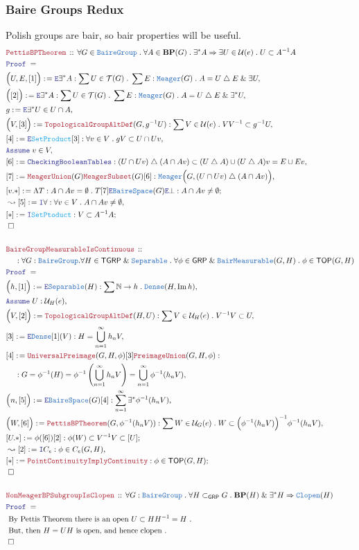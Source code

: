 \documentclass[12pt]{scrartcl}
\newcommand{\TYPE}[1]{\textcolor{NavyBlue}{\mathtt{#1}}}
\newcommand{\FUNC}[1]{\textcolor{Cerulean}{\mathtt{#1}}}
\newcommand{\LOGIC}[1]{\textcolor{Blue}{\mathtt{#1}}}
\newcommand{\THM}[1]{\textcolor{Maroon}{\mathtt{#1}}}
\renewcommand{\.}{\; . \;}
\newcommand{\de}{: \kern 0.1pc =}
\newcommand{\Theorem}[2]{& \THM{#1} \, :: \, #2 \\ & \Proof = \\ }
\newcommand{\NewLine}{\\ & \kern 1pc}
\newcommand{\Page}[1]{ \begin{align*} #1 \end{align*}   }
\renewcommand{\And}{\; \& \;}
\newcommand{\Imply}{\Rightarrow}
\newcommand{\Nat}{\mathbb{N} }
\DeclareMathOperator*{\im}{Im}
\newcommand{\du}{\; \triangle \;}
\newcommand{\Say}[3]{& #1 \de #2 : #3, \\}
\newcommand{\SayIn}[3]{& #1 \de #2 \in #3, \\}
\newcommand{\Conclude}[3]{& #1 \de #2 : #3; \\}
\newcommand{\Derive}[3]{& \leadsto #1 \de #2 : #3, \\}
\newcommand{\Assume}[2]{& \LOGIC{Assume} \; #1 : #2, \\}
\newcommand{\AssumeIn}[2]{& \LOGIC{Assume} \; #1 \in #2, \\}
\newcommand{\Explain}[1]{& \text{#1.} \\}
\newcommand{\Intro}{\LOGIC{I}}
\newcommand{\Elim}{\LOGIC{E}}
\newcommand{\QED}{\; \square}
\newcommand{\EndProof}{& \QED \\}
\newcommand{\Proof}{\LOGIC{Proof} \; }
\newcommand{\Dense}{\TYPE{Dense}}
\newcommand{\Separable}{\TYPE{Separable}}
\newcommand{\Clopen}{\TYPE{Clopen}}
\newcommand{\Bair}{\TYPE{BaireSpace}}
\newcommand{\Meager}{\TYPE{Meager}}
\newcommand{\TOP}{\mathsf{TOP}}
\newcommand{\T}{\mathcal{T}}
\renewcommand{\U}{\mathcal{U}}
\newcommand{\BP}{\mathbf{BP}}
\newcommand{\BM}{\TYPE{BairMeasurable}}
\newcommand{\GRP}{\mathsf{GRP}}
\newcommand{\BG}{\TYPE{BaireGroup}}
\newcommand{\TGRP}{\mathsf{TGRP}}
\begin{document}
\subsubsection{Baire Groups Redux}
Polish groups are bair, so bair properties will be useful.
\Page{
	\Theorem{PettisBPTheorem}
	{
		\forall G \in  \BG \.
		\forall A \in \BP(G) \.
		\exists^* A \Imply
		\exists U \in \U(e) \. U \subset A^{-1} A
	}
	\Say{\Big(U,E,[1]\Big)}
	{
		\Elim \exists^* A
	}
	{
		\sum U \in \T(G) \.
		\sum E : \Meager(G) \.		
		A = U \du E
		\And
		\exists U 
	}
	\Say{\Big([2]\Big)}
	{
		\Elim \exists^* A
	}
	{
		\sum U \in \T(G) \.
		\sum E : \Meager(G) \.		
		A = U \du E
		\And
		\exists^* U 
	}
	\SayIn{g}{\Elim \exists^* U}
	{
		U \cap A
	}
	\Say{\Big( V,[3]\Big)}
	{
		\THM{TopologicalGroupAltDef}(G,g^{-1}U)
	}
	{
		\sum V \in \U(e) \. VV^{-1} \subset g^{-1}U
	}
	\Say{[4]}{\Elim \FUNC{SetProduct}[3]}
	{
		\forall v \in V \.    gV \subset U \cap Uv
	}
	\AssumeIn{v}{V}
	\Say{[6]}{\LOGIC{CheckingBooleanTables}}
	{
		(U \cap Uv) \du (A \cap Av) 
		\subset (U \du A) \cup  (U \du A)v =
		E \cup Ev		
	}
	\Say{[7]}{\THM{MeagerUnion}(G)\THM{MeagerSubset}(G)[6]}
	{
		\Meager\Big( G, (U \cap Uv) \du (A \cap Av) \Big)
	}
	\Conclude{[v.*]}
	{
		\Lambda T : A \cap Av = \emptyset \. 
		T[7]\Elim \Bair(G)\Elim \bot
	}
	{
		A \cap Av \neq \emptyset
	}
	\Derive{[5]}{\Intro \forall}
	{
		\forall v \in V \.  A \cap Av \neq \emptyset
	}
	\Conclude{[*]}{\Intro \FUNC{SetPtoduct}}
	{
		V \subset A^{-1}A
	}
	\EndProof
	\\
	\Theorem{BaireGroupMeasurableIsContinuous}
	{
		\NewLine :		
		\forall G  : \BG.
		\forall H \in \TGRP \And \Separable \.
		\forall \phi \in \GRP\And\BM(G,H) \.
		\phi \in \TOP(G,H)
	}
	\Say{\Big(h,[1]\Big)}{\Elim \Separable(H)}
	{
		\sum \Nat \to h \. \Dense(H,\im h)
	}
	\Assume{U}{\U_H(e)}
	\Say{\Big(V,[2]\Big)}
	{
		\THM{TopologicalGroupAltDef}(H,U)
	}
	{
		\sum V \in \U_H(e) \. V^{-1}V \subset U
	}
	\Say{[3]}{\Elim \Dense [1](V)}{H = \bigcup^\infty_{n=1} h_n V}
	\Say{[4]}{\THM{UniversalPreimage}(G,H,\phi)[3]\THM{PreimageUnion}(G,H,\phi)}
	{
		\NewLine :		
		G = \phi^{-1}(H) =
		\phi^{-1} \left(\bigcup^\infty_{n=1} h_n V\right) =
		\bigcup^\infty_{n=1} \phi^{-1}(h_n V)
	}
	\Say{\Big(n,[5]\Big)}
	{
		\Elim \Bair(G)[4]
	}
	{
		\sum^\infty_{n=1} \exists^* \phi^{-1}(h_n V)
	}
	\Say{\Big(W,[6]\Big) }{\THM{PettisBPTheorem}(G,\phi^{-1}(h_n V))}
	{
		\sum W \in \U_G(e) \.  
		W \subset  \Big(\phi^{-1}(h_n V)\Big)^{-1} \phi^{-1}(h_n V)
	}
	\Conclude{[U.*]}{\phi([6])[2]}
	{
		\phi(W) \subset V^{-1}V \subset [U]
	}
	\Derive{[2]}{\Intro C_e}{\phi \in C_e(G,H)}
	\Conclude{[*]}{\THM{PointContinuityImplyContinuity}}
	{
		\phi \in \TOP(G,H)
	}
	\EndProof
	\\
	\Theorem{
		NonMeagerBPSubgroupIsClopen
	}
	{
		\forall G : \BG \.
		\forall H \subset_\GRP G \.
		\BP(H) \And \exists^* H \Imply \Clopen(H)
	}
	\Explain{
		By Pettis Theorem there is an open $U\subset HH^{-1} = H$
	}
	\Explain{
		But, then $H  = UH$ is open, and hence clopen	
	}
	\EndProof	
}
\end{document}
